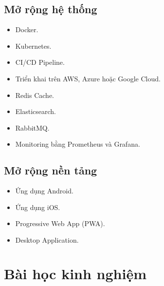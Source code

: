 
\subsection{Mở rộng hệ thống}

\begin{itemize}

\item Docker.

\item Kubernetes.

\item CI/CD Pipeline.

\item Triển khai trên AWS, Azure hoặc Google Cloud.

\item Redis Cache.

\item Elasticsearch.

\item RabbitMQ.

\item Monitoring bằng Prometheus và Grafana.

\end{itemize}


\subsection{Mở rộng nền tảng}

\begin{itemize}

\item Ứng dụng Android.

\item Ứng dụng iOS.

\item Progressive Web App (PWA).

\item Desktop Application.

\end{itemize}

\section{Bài học kinh nghiệm}


